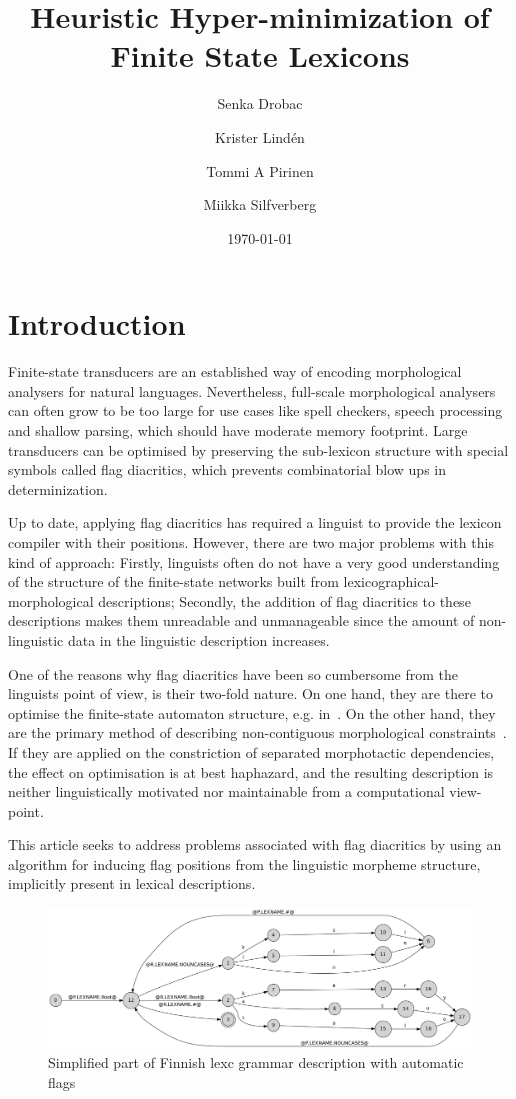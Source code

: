 \documentclass[10pt, a4paper]{article}
\title{Heuristic Hyper-minimization of Finite State Lexicons}
\author[1]{Senka Drobac}
\author[1]{Krister Lind\'{e}n}
\author[2]{Tommi A Pirinen}
\author[1]{Miikka Silfverberg}
\affil[1]{Department of Modern Languages, PO Box 24, 00014 University of Helsinki}
\affil[2]{Department of Speech Sciences, PO Box 9, 00014 University of Helsinki}
\date{\today}
\begin{document}
\maketitleabstract


\section{Introduction}

Finite-state transducers are an established way of encoding
morphological analysers for natural languages. Nevertheless,
full-scale morphological analysers can often grow to be too large for
use cases like spell checkers, speech processing and shallow parsing, which 
should have moderate memory footprint. Large transducers can be optimised by preserving the sub-lexicon structure with special symbols called flag diacritics, which prevents combinatorial blow ups in determinization.


Up to date, applying flag diacritics has required a linguist to provide
the lexicon compiler with their positions. However, there are two
major problems with this kind of approach: Firstly, linguists often do
not have a very good understanding of the structure of the
finite-state networks built from lexicographical-morphological
descriptions; Secondly, the addition of flag diacritics to these
descriptions makes them unreadable and unmanageable since the amount
of non-linguistic data in the linguistic description increases. 

One of the reasons why flag diacritics have been so cumbersome from
the linguists point of view, is their two-fold nature. On one hand,
they are there to optimise the finite-state automaton structure,
e.g. in~\cite{karttunen2006numbers}. On the other hand, they are the
primary method of describing non-contiguous morphological
constraints~\cite{beesley1998constraining}. If they are applied on the
constriction of separated morphotactic dependencies, the effect on
optimisation is at best haphazard, and the resulting description is
neither linguistically motivated nor maintainable from a computational
view-point.

This article seeks to address problems associated with flag diacritics
by using an algorithm for inducing flag positions from the linguistic
morpheme structure, implicitly present in lexical
descriptions.

\begin{figure}
    \includegraphics[width=\textwidth]{transducer.png}
     \caption{Simplified part of Finnish lexc grammar description with automatic flags
     \label{fig:lexc-fin-flag}}
\end{figure}
\end{document}
